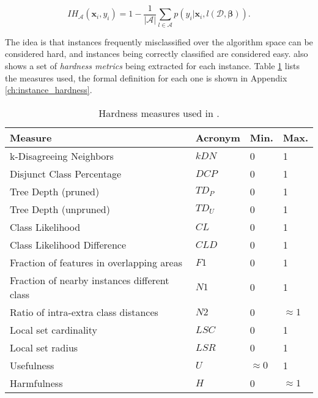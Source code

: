 \begin{equation}
	IH_{\mathcal{A}}(\mathbf{x}_i, y_i) = 1 - \frac{1}{|\mathcal{A}|} \sum_{l \in \mathcal{A}} p(y_i | \mathbf{x}_i, l(\mathcal{D}, \mathbf{\beta})).
\end{equation}

The idea is that instances frequently misclassified over the algorithm space can be considered hard, and instances being correctly classified are considered easy. \cite{Lorena2022} also shows a set of \emph{hardness metrics} being extracted for each instance. Table \ref{tab:hardness_measures} lists the measures used, the formal definition for each one is shown in Appendix \ref{ch:instance_hardness}.

\begin{table}[ht]
	\centering
	\begin{tabular}{llll}
		\hline
		Measure                                      & Acronym & Min.        & Max.        \\ \hline
		k-Disagreeing Neighbors                      & $kDN$   & 0           & 1           \\
		Disjunct Class Percentage                    & $DCP$   & 0           & 1           \\
		Tree Depth (pruned)                          & $TD_P$  & 0           & 1           \\
		Tree Depth (unpruned)                        & $TD_U$  & 0           & 1           \\
		Class Likelihood                             & $CL$    & 0           & 1           \\
		Class Likelihood Difference                  & $CLD$   & 0           & 1           \\
		Fraction of features in overlapping areas    & $F1$    & 0           & 1           \\
		Fraction of nearby instances different class & $N1$    & 0           & 1           \\
		Ratio of intra-extra class distances         & $N2$    & 0           & $\approx 1$ \\
		Local set cardinality                        & $LSC$   & 0           & 1           \\
		Local set radius                             & $LSR$   & 0           & 1           \\
		Usefulness                                   & $U$     & $\approx 0$ & 1           \\
		Harmfulness                                  & $H$     & 0           & $\approx 1$ \\ \hline
	\end{tabular}
	\caption{Hardness measures used in \cite{Lorena2022}.} \label{tab:hardness_measures}
\end{table}

